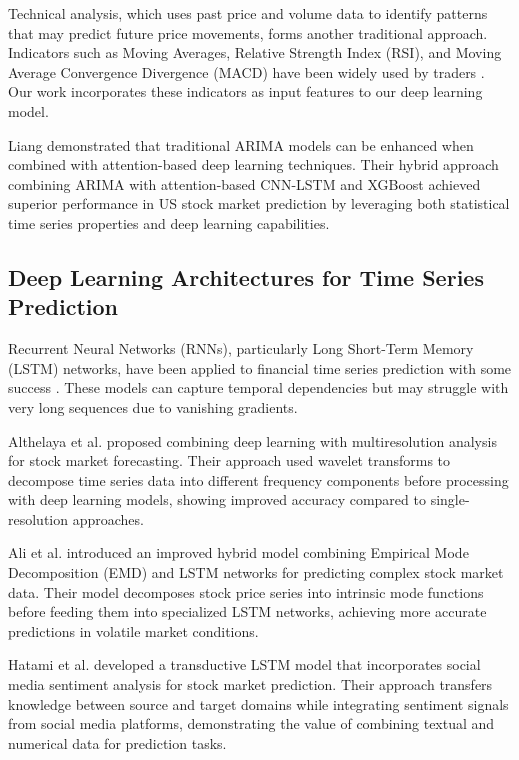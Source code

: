 \documentclass[conference]{IEEEtran}
\begin{document}
Technical analysis, which uses past price and volume data to identify patterns that may predict future price movements, forms another traditional approach. Indicators such as Moving Averages, Relative Strength Index (RSI), and Moving Average Convergence Divergence (MACD) have been widely used by traders \cite{murphy1999technical}. Our work incorporates these indicators as input features to our deep learning model.

Liang \cite{liang2024arima} demonstrated that traditional ARIMA models can be enhanced when combined with attention-based deep learning techniques. Their hybrid approach combining ARIMA with attention-based CNN-LSTM and XGBoost achieved superior performance in US stock market prediction by leveraging both statistical time series properties and deep learning capabilities.

\subsection{Deep Learning Architectures for Time Series Prediction}
Recurrent Neural Networks (RNNs), particularly Long Short-Term Memory (LSTM) networks, have been applied to financial time series prediction with some success \cite{fischer2018deep}. These models can capture temporal dependencies but may struggle with very long sequences due to vanishing gradients.

Althelaya et al. \cite{althelaya2021combining} proposed combining deep learning with multiresolution analysis for stock market forecasting. Their approach used wavelet transforms to decompose time series data into different frequency components before processing with deep learning models, showing improved accuracy compared to single-resolution approaches.

Ali et al. \cite{ali2023prediction} introduced an improved hybrid model combining Empirical Mode Decomposition (EMD) and LSTM networks for predicting complex stock market data. Their model decomposes stock price series into intrinsic mode functions before feeding them into specialized LSTM networks, achieving more accurate predictions in volatile market conditions.

Hatami et al. \cite{hatami2024stock} developed a transductive LSTM model that incorporates social media sentiment analysis for stock market prediction. Their approach transfers knowledge between source and target domains while integrating sentiment signals from social media platforms, demonstrating the value of combining textual and numerical data for prediction tasks.
\end{document}
